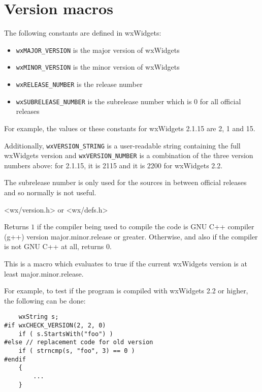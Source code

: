\section{Version macros}\label{versionfunctions}

The following constants are defined in wxWidgets:

\begin{itemize}\itemsep=0pt
\item {\tt wxMAJOR\_VERSION} is the major version of wxWidgets
\item {\tt wxMINOR\_VERSION} is the minor version of wxWidgets
\item {\tt wxRELEASE\_NUMBER} is the release number
\item {\tt wxSUBRELEASE\_NUMBER} is the subrelease number which is $0$ for all
official releases
\end{itemize}

For example, the values or these constants for wxWidgets 2.1.15 are 2, 1 and
15.

Additionally, {\tt wxVERSION\_STRING} is a user-readable string containing
the full wxWidgets version and {\tt wxVERSION\_NUMBER} is a combination of the
three version numbers above: for 2.1.15, it is 2115 and it is 2200 for
wxWidgets 2.2.

The subrelease number is only used for the sources in between official releases
and so normally is not useful.


<wx/version.h> or <wx/defs.h>


\label{wxcheckgccversion}


Returns $1$ if the compiler being used to compile the code is GNU C++
compiler (g++) version major.minor.release or greater. Otherwise, and also if
the compiler is not GNU C++ at all, returns $0$.


\label{wxcheckversion}


This is a macro which evaluates to true if the current wxWidgets version is at
least major.minor.release.

For example, to test if the program is compiled with wxWidgets 2.2 or higher,
the following can be done:

\begin{verbatim}
    wxString s;
#if wxCHECK_VERSION(2, 2, 0)
    if ( s.StartsWith("foo") )
#else // replacement code for old version
    if ( strncmp(s, "foo", 3) == 0 )
#endif
    {
        ...
    }
\end{verbatim}



